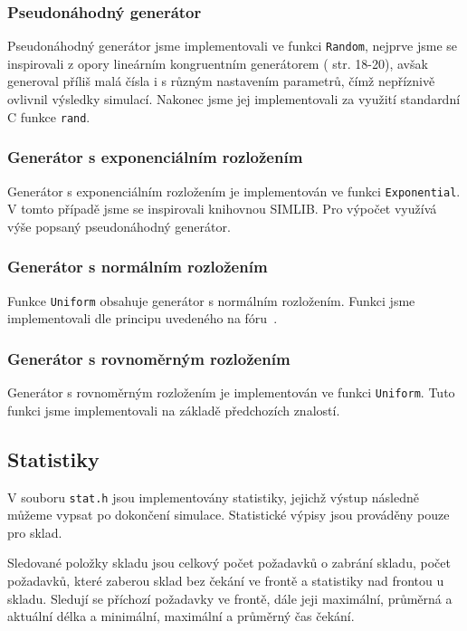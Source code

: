 \documentclass[12pt,a4paper,titlepage,final]{article}
\begin{document}
\subsubsection{Pseudonáhodný generátor}

Pseudonáhodný generátor jsme implementovali ve funkci \texttt{Random}, nejprve jsme se inspirovali z opory lineárním kongruentním generátorem (\cite{opora} str. 18-20), avšak generoval příliš malá čísla i s různým nastavením parametrů, čímž nepříznivě ovlivnil výsledky simulací. Nakonec jsme jej implementovali za využití standardní C funkce \texttt{rand}.

\subsubsection{Generátor s exponenciálním rozložením}

Generátor s exponenciálním rozložením je implementován ve funkci \texttt{Exponential}. V tomto případě jsme se inspirovali knihovnou SIMLIB. Pro výpočet využívá výše popsaný pseudonáhodný generátor.

\subsubsection{Generátor s normálním rozložením}

Funkce \texttt{Uniform} obsahuje generátor s normálním rozložením. Funkci jsme implementovali dle principu uvedeného na fóru~\cite{forum}.

\subsubsection{Generátor s rovnoměrným rozložením}

Generátor s rovnoměrným rozložením je implementován ve funkci \texttt{Uniform}. Tuto funkci jsme implementovali na základě předchozích znalostí.

\subsection{Statistiky}

V souboru \texttt{stat.h} jsou implementovány statistiky, jejichž výstup následně můžeme vypsat po dokončení simulace. Statistické výpisy jsou prováděny pouze pro sklad. 

Sledované položky skladu jsou celkový počet požadavků o zabrání skladu, počet požadavků, které zaberou sklad bez čekání ve frontě a statistiky nad frontou u skladu. Sledují se příchozí požadavky ve frontě, dále jeji maximální, průměrná a aktuální délka a minimální, maximální a průměrný čas čekání. 
\end{document}
